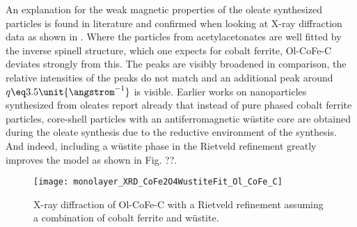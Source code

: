 \documentclass[\main/dresen_thesis.tex]{subfiles}
\begin{document}
    An explanation for the weak magnetic properties of the oleate synthesized particles is found in literature and confirmed when looking at X-ray diffraction data as shown in .
    Where the particles from acetylacetonates are well fitted by the inverse spinell structure, which one expects for cobalt ferrite, Ol-CoFe-C deviates strongly from this.
    The peaks are visibly broadened in comparison, the relative intensities of the peaks do not match and an additional peak around $q \eq 3.5 \unit{\angstrom^{-1}}$ is visible.
    Earlier works on nanoparticles synthesized from oleates \cite{Bodnarchuk_2009_Excha, Wetterskog_2013_Anoma} report already that instead of pure phased cobalt ferrite particles, core-shell particles with an antiferromagnetic w\"ustite core are obtained during the oleate synthesis due to the reductive environment of the synthesis.
    And indeed, including a w\"ustite phase in the Rietveld refinement greatly improves the model as shown in Fig. ??.

    \begin{figure}[tb]
      \centering
      \texttt{[image: monolayer\_XRD\_CoFe2O4WustiteFit\_Ol\_CoFe\_C]}
      \caption{\label{fig:monolayers:nanoparticle:xrd}X-ray diffraction of Ol-CoFe-C with a Rietveld refinement assuming a combination of cobalt ferrite and w\"ustite.}
    \end{figure}
\end{document}
